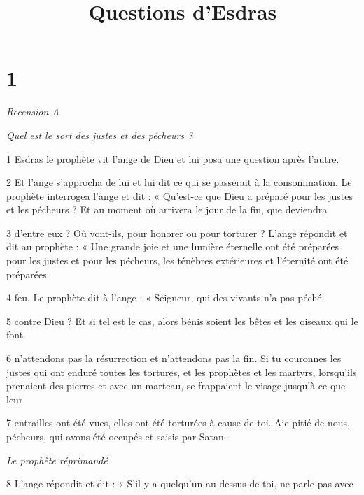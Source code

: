

\title{Questions d'Esdras}

\chapter{1}

\par \textit{Recension A}

\par \textit{Quel est le sort des justes et des pécheurs ?}

\par 1 Esdras le prophète vit l'ange de Dieu et lui posa une question après l'autre.

\par 2 Et l'ange s'approcha de lui et lui dit ce qui se passerait à la consommation. Le prophète interrogea l’ange et dit : « Qu’est-ce que Dieu a préparé pour les justes et les pécheurs ? Et au moment où arrivera le jour de la fin, que deviendra

\par 3 d'entre eux ? Où vont-ils, pour honorer ou pour torturer ? L'ange répondit et dit au prophète : « Une grande joie et une lumière éternelle ont été préparées pour les justes et pour les pécheurs, les ténèbres extérieures et l'éternité ont été préparées.

\par 4 feu. Le prophète dit à l'ange : « Seigneur, qui des vivants n'a pas péché

\par 5 contre Dieu ? Et si tel est le cas, alors bénis soient les bêtes et les oiseaux qui le font

\par 6 n'attendons pas la résurrection et n'attendons pas la fin. Si tu couronnes les justes qui ont enduré toutes les tortures, et les prophètes et les martyrs, lorsqu'ils prenaient des pierres et avec un marteau, se frappaient le visage jusqu'à ce que leur

\par 7 entrailles ont été vues, elles ont été torturées à cause de toi. Aie pitié de nous, pécheurs, qui avons été occupés et saisis par Satan.

\par \textit{Le prophète réprimandé}

\par 8 L'ange répondit et dit : « S'il y a quelqu'un au-dessus de toi, ne parle pas avec

